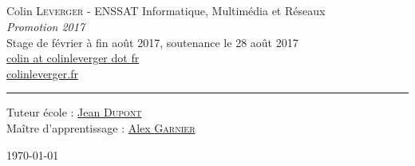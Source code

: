 \begin{titlepage}
\begin{sffamily}
\begin{center}
    \textsc{\Large \quelrapport}\\[1.5cm]

    \HRule \\[1cm]
    { \titre \\[1cm] }
    \HRule \\[1.5cm]

    \large
    		Colin \textsc{Leverger} -
        ENSSAT Informatique, Multimédia et Réseaux \\
        \emph{Promotion 2017}\\[0.5cm]
        Stage de février à fin août 2017, soutenance le 28 août 2017\\[0.5cm]
        \href{mailto:colinleverger@gmail.com}{colin \lbrack{}at\rbrack{} colinleverger \lbrack{}dot\rbrack{} fr}\\[0.5cm]
        \href{http://www.colinleverger.fr}{colinleverger.fr}
        \skipduhaut
    \rule{\linewidth}{0.2mm}
    Tuteur école : \href{mailto:some-people@some-univ.fr}{Jean \textsc{Dupont}}\\
    Maître d'apprentissage : \href{mailto:some-people@some-company.fr}{Alex \textsc{Garnier}}
    \vfill

    \today

  \end{center}
  \end{sffamily}
\end{titlepage}
